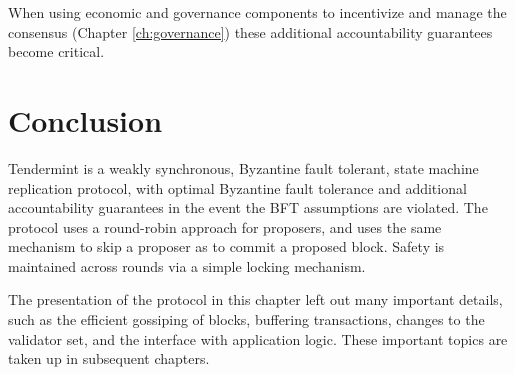 When using economic and governance components to incentivize and manage the consensus (Chapter  \ref{ch:governance})
these additional accountability guarantees become critical.

\section{Conclusion}

Tendermint is a weakly synchronous, Byzantine fault tolerant, state machine replication protocol,
with optimal Byzantine fault tolerance and additional accountability guarantees in the event
the BFT assumptions are violated. 
The protocol uses a round-robin approach for proposers, and uses the same mechanism to skip a proposer as to commit a proposed block.
Safety is maintained across rounds via a simple locking mechanism.

The presentation of the protocol in this chapter left out many important details, 
such as the efficient gossiping of blocks, buffering transactions, changes to the validator set, 
and the interface with application logic. These important topics are taken up in subsequent chapters.


